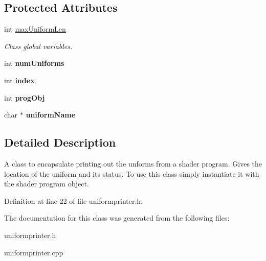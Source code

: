 \subsection*{Protected Attributes}
\begin{DoxyCompactItemize}
\item 
\mbox{\label{classUniformPrinter_a36b9f4d82dd0f6cfc32cc2a3dc12790b}} 
int \hyperlink{classUniformPrinter_a36b9f4d82dd0f6cfc32cc2a3dc12790b}{max\+Uniform\+Len}
\begin{DoxyCompactList}\small\item\em Class global variables. \end{DoxyCompactList}\item 
\mbox{\label{classUniformPrinter_a88a34ee546f9a05830c3e393b6faedf0}} 
int {\bfseries num\+Uniforms}
\item 
\mbox{\label{classUniformPrinter_a21b01430e1306d961bc654cd756f155c}} 
int {\bfseries index}
\item 
\mbox{\label{classUniformPrinter_abc63b1870491ebccbd55684f5aa8e942}} 
int {\bfseries prog\+Obj}
\item 
\mbox{\label{classUniformPrinter_a5a6265447a37c22ebf89dc15beea8818}} 
char $\ast$ {\bfseries uniform\+Name}
\end{DoxyCompactItemize}


\subsection{Detailed Description}
A class to encapsulate printing out the unforms from a shader program. Gives the location of the uniform and it\textquotesingle{}s status. To use this class simply instantiate it with the shader program object. 

Definition at line 22 of file uniformprinter.\+h.



The documentation for this class was generated from the following files\+:\begin{DoxyCompactItemize}
\item 
uniformprinter.\+h\item 
uniformprinter.\+cpp\end{DoxyCompactItemize}
